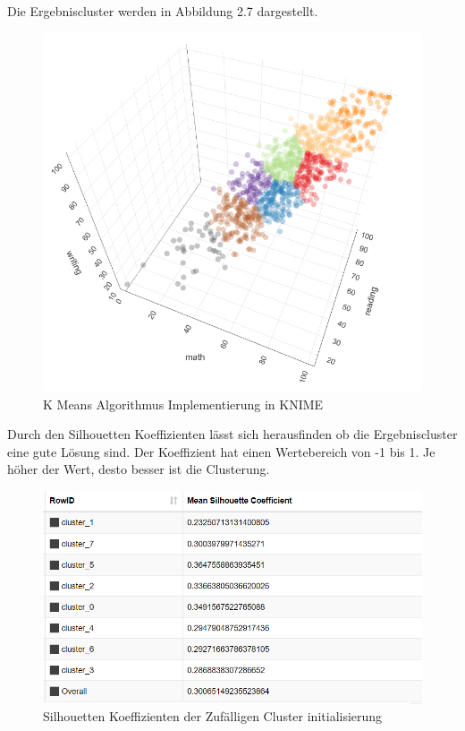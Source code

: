 \documentclass[12pt,					%
							 oneside,			%
							 a4paper,			%
							 halfparskip,		%
							 liststotoc,			%
							 bibtotoc,			%
							 fleqn,				%
							 pointlessnumbers]	%
							 {scrreprt}
\begin{document}
		Die Ergebniscluster werden in Abbildung 2.7 dargestellt.
		
		\begin{figure}[!h]
			\begin{center}
				\includegraphics[scale=0.6]{pictures/cluster.png}
				\caption{K Means Algorithmus Implementierung in KNIME}
			\end{center}
		\end{figure}
		
		Durch den Silhouetten Koeffizienten lässt sich herausfinden ob die Ergebniscluster eine gute Lösung sind. Der Koeffizient hat einen Wertebereich von -1 bis 1. Je höher der Wert, desto besser ist die Clusterung.
		\newpage
		\begin{figure}[!h]
			\begin{center}
				\includegraphics[scale=0.5]{pictures/sil_mean.png}
				\caption{Silhouetten Koeffizienten der Zufälligen Cluster initialisierung}
			\end{center}
		\end{figure}
		
\end{document}
